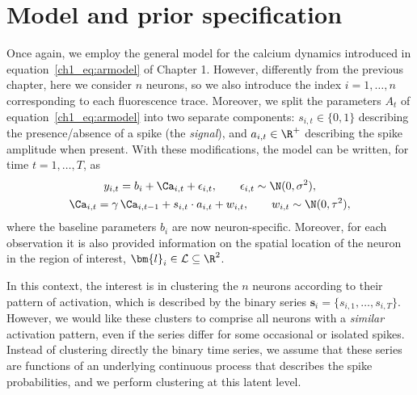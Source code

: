 \section{Model and prior specification}
Once again, we employ the general model for the calcium dynamics introduced in equation~\eqref{ch1_eq:armodel} of Chapter 1. However, differently from the previous chapter, here we consider $n$ neurons, so we also introduce the index $i=1,\dots,n$ corresponding to each fluorescence trace. 
Moreover, we split the parameters $A_t$ of equation~\eqref{ch1_eq:armodel} into two separate components: $s_{i,t}\in\{0,1\}$ describing the presence/absence of a spike (the \textit{signal}), and $a_{i,t}\in\R^+$ describing the spike amplitude when present.
With these modifications, the model can be written, for time $t=1,\dots,T$, as
\begin{equation}
\begin{gathered}
y_{i,t} = b_i + \Ca_{i,t} + \epsilon_{i,t},\qquad \epsilon_{i,t} \sim \N(0,\sigma^2),  \\
\Ca_{i,t} = \gamma\, \Ca_{i,t-1} + s_{i,t}\cdot a_{i,t} + w_{i,t}, \qquad w_{i,t} \sim \N(0, \tau^2),
\end{gathered}
\label{ch4_eq:armodel_mult}
\end{equation}
where the baseline parameters $b_i$ are now neuron-specific.
Moreover, for each observation it is also provided information on the spatial location of the neuron in the region of interest, $\bm{l}_i \in \mathcal{L}\subseteq\R^2$.

In this context, the interest is in clustering the $n$ neurons according to their pattern of activation, which is described by the binary series $\bm{s}_i = \{s_{i,1},\dots,s_{i,T}\}$. However, we would like these clusters to comprise all neurons with a \textit{similar} activation pattern, even if the series differ for some occasional or isolated spikes. Instead of clustering directly the binary time series, we assume that these series are functions of an underlying continuous process that describes the spike probabilities, and we perform clustering at this latent level.


